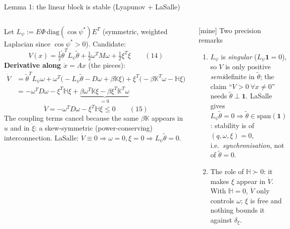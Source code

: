 \documentclass[aspectratio=169,9pt]{beamer}
\newcommand{\bbK}{\mathbb{K}}
\newcommand{\bbH}{\mathbb{H}}
\newcommand{\ones}{\mathbf{1}}
\begin{document}
\begin{frame}[t]{Lemma 1: the linear block is stable (Lyapunov + LaSalle)}
\footnotesize
\begin{columns}[T]
Let $L_\psi:=E\Phi\,\mathrm{diag}(\cos\psi^*)E^T$ (symmetric, weighted Laplacian since $\cos\psi^*>0$). Candidate:
\[V(x)=\tfrac12\tilde\theta^TL_\psi\tilde\theta+\tfrac12\omega^TM\omega+\tfrac12\xi^T\xi\qquad(14)\]
\textbf{Derivative along $\dot x=Ax$} (the pieces):
\begin{align*}
\dot V&=\tilde\theta^TL_\psi\omega+\omega^T\!\bigl(-L_\psi\tilde\theta-D\omega+\beta\bbK\xi\bigr)+\xi^T\!\bigl(-\beta\bbK^T\omega-\bbH\xi\bigr)\\
&=-\omega^TD\omega-\xi^T\bbH\xi+\underbrace{\beta\omega^T\bbK\xi-\beta\xi^T\bbK^T\omega}_{=0}
\end{align*}
\[\boxed{\dot V=-\omega^TD\omega-\xi^T\bbH\xi\le0}\qquad(15)\]
The coupling terms cancel because the same $\beta\bbK$ appears in $u$ and in $\dot\xi$: a skew-symmetric (power-conserving) interconnection. LaSalle: $\dot V\equiv0\Rightarrow\omega=0,\xi=0\Rightarrow L_\psi\tilde\theta=0$.
\begin{alertblock}{[mine] Two precision remarks}
\begin{enumerate}
\item $L_\psi$ is \emph{singular} ($L_\psi\ones=0$), so $V$ is only positive \emph{semi}definite in $\tilde\theta$; the claim ``$V>0\ \forall x\ne0$'' needs $\tilde\theta\perp\ones$. LaSalle gives $L_\psi\tilde\theta=0\Rightarrow\tilde\theta\in\mathrm{span}(\ones)$: stability is of $(q,\omega,\xi)=0$, i.e.\ \emph{synchronisation}, not of $\tilde\theta=0$.
\item The role of $\bbH\succ0$: it makes $\xi$ appear in $\dot V$. With $\bbH=0$, $\dot V$ only controls $\omega$; $\xi$ is free and nothing bounds it against $\delta_\xi$.
\end{enumerate}
\end{alertblock}
\end{columns}
\end{frame}
\end{document}
